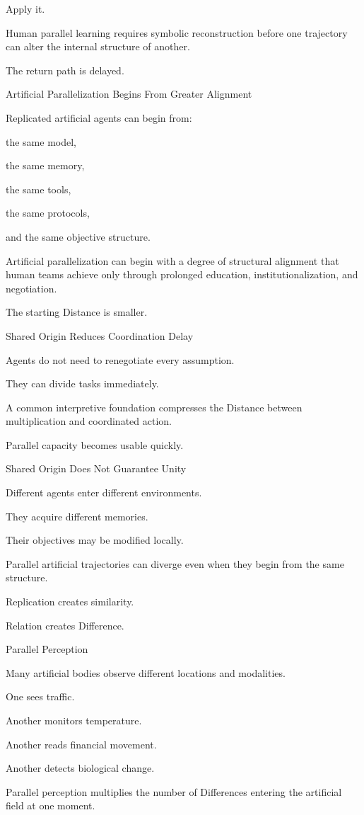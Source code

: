 Apply it.

Human parallel learning requires symbolic reconstruction before one trajectory can alter the internal structure of another.

The return path is delayed.

Artificial Parallelization Begins From Greater Alignment

Replicated artificial agents can begin from:

the same model,

the same memory,

the same tools,

the same protocols,

and the same objective structure.

Artificial parallelization can begin with a degree of structural alignment that human teams achieve only through prolonged education, institutionalization, and negotiation.

The starting Distance is smaller.

Shared Origin Reduces Coordination Delay

Agents do not need to renegotiate every assumption.

They can divide tasks immediately.

A common interpretive foundation compresses the Distance between multiplication and coordinated action.

Parallel capacity becomes usable quickly.

Shared Origin Does Not Guarantee Unity

Different agents enter different environments.

They acquire different memories.

Their objectives may be modified locally.

Parallel artificial trajectories can diverge even when they begin from the same structure.

Replication creates similarity.

Relation creates Difference.

Parallel Perception

Many artificial bodies observe different locations and modalities.

One sees traffic.

Another monitors temperature.

Another reads financial movement.

Another detects biological change.

Parallel perception multiplies the number of Differences entering the artificial field at one moment.

